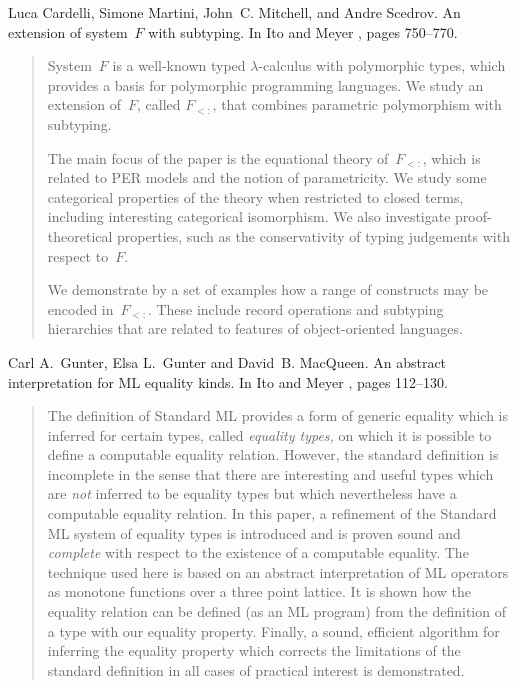 \begin{thebibliography}{10}
Luca Cardelli, Simone Martini, John~C. Mitchell, and Andre Scedrov.
\newblock An extension of system~{$F$} with subtyping.
\newblock In Ito and Meyer \cite{TACS91}, pages 750--770.
\begin{quotation}
System~$F$ is a well-known typed $\lambda$-calculus with polymorphic types,
  which provides a basis for polymorphic programming languages. We study an
  extension of~$F$, called $F_{<:}$, that combines parametric polymorphism with
  subtyping. \par The main focus of the paper is the equational theory
  of~$F_{<:}$, which is related to PER models and the notion of parametricity.
  We study some categorical properties of the theory when restricted to closed
  terms, including interesting categorical isomorphism. We also investigate
  proof-theoretical properties, such as the conservativity of typing judgements
  with respect to~$F$. \par We demonstrate by a set of examples how a range of
  constructs may be encoded in~$F_{<:}$. These include record operations and
  subtyping hierarchies that are related to features of object-oriented
  languages.
\end{quotation}

Carl A.~Gunter, Elsa L.~Gunter and David~B. MacQueen.
\newblock An abstract interpretation for {ML} equality kinds.
\newblock In Ito and Meyer \cite{TACS91}, pages 112--130.
\begin{quotation}
The definition of Standard ML provides a form of generic equality which is
  inferred for certain types, called {\em equality types,} on which it is
  possible to define a computable equality relation. However, the standard
  definition is incomplete in the sense that there are interesting and useful
  types which are {\em not} inferred to be equality types but which
  nevertheless have a computable equality relation. In this paper, a refinement
  of the Standard ML system of equality types is introduced and is proven sound
  and {\em complete} with respect to the existence of a computable equality.
  The technique used here is based on an abstract interpretation of ML
  operators as monotone functions over a three point lattice. It is shown how
  the equality relation can be defined (as an ML program) from the definition
  of a type with our equality property. Finally, a sound, efficient algorithm
  for inferring the equality property which corrects the limitations of the
  standard definition in all cases of practical interest is demonstrated.
\end{quotation}


\end{thebibliography}
